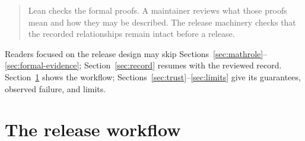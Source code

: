 \documentclass[11pt]{article}
\begin{document}
\begin{quote}
Lean checks the formal proofs.  A maintainer reviews what those proofs mean
and how they may be described.  The release machinery checks that the recorded
relationships remain intact before a release.
\end{quote}

Readers focused on the release design may skip
Sections~\ref{sec:mathrole}--\ref{sec:formal-evidence}; Section~\ref{sec:record}
resumes with the reviewed record.  Section~\ref{sec:picture} shows the workflow;
Sections~\ref{sec:trust}--\ref{sec:limits} give its guarantees, observed failure,
and limits.

\section{The release workflow}\label{sec:picture}
\end{document}
